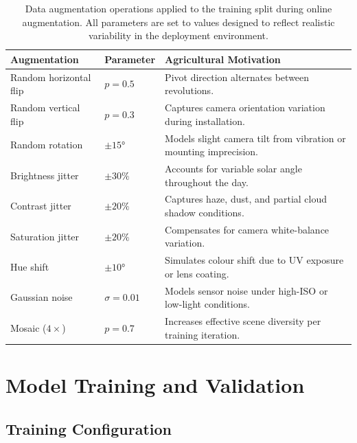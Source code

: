 \documentclass[12pt,a4paper]{report}
\renewcommand{\arraystretch}{1.3}
\begin{document}
\begin{table}[H]
\centering
\small
\caption{Data augmentation operations applied to the training split during online augmentation. All parameters are set to values designed to reflect realistic variability in the deployment environment.}
\label{tab:augmentation}
\setlength{\tabcolsep}{4pt}
\renewcommand{\arraystretch}{1.3}
\begin{tabular}{|P{0.28\textwidth}|P{0.22\textwidth}|P{0.40\textwidth}|}
\hline
{}
\textbf{Augmentation} & \textbf{Parameter} & \textbf{Agricultural Motivation} \\
\hline
Random horizontal flip & $p = 0.5$ & Pivot direction alternates between revolutions. \\
\hline
{}
Random vertical flip & $p = 0.3$ & Captures camera orientation variation during installation. \\
\hline
Random rotation & $\pm 15°$ & Models slight camera tilt from vibration or mounting imprecision. \\
\hline
{}
Brightness jitter & $\pm 30\%$ & Accounts for variable solar angle throughout the day. \\
\hline
Contrast jitter & $\pm 20\%$ & Captures haze, dust, and partial cloud shadow conditions. \\
\hline
{}
Saturation jitter & $\pm 20\%$ & Compensates for camera white-balance variation. \\
\hline
Hue shift & $\pm 10°$ & Simulates colour shift due to UV exposure or lens coating. \\
\hline
{}
Gaussian noise & $\sigma = 0.01$ & Models sensor noise under high-ISO or low-light conditions. \\
\hline
Mosaic ($4\times$) & $p = 0.7$ & Increases effective scene diversity per training iteration. \\
\hline
\end{tabular}
\end{table}

\section{Model Training and Validation}

\subsection{Training Configuration}
\end{document}
